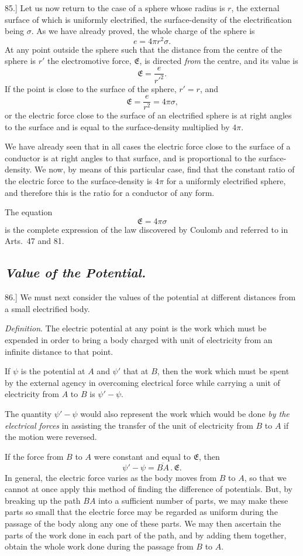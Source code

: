 \documentclass[12pt,oneside]{book}[2021/10/04]
\newcommand{\ldot}{\,.\,}
\newcommand{\Heading}{\centering\normalfont}
\newcommand{\Subsection}[1]{\subsection*{\normalsize\Heading\itshape #1}}
\newcommand{\Runhead}[1]{\fancyhead[C]{\iffloatpage{}{\small#1}}}
\newcommand{\article}[1]{\phantomsection \label{art:#1}{#1.]}}
\newcommand{\¬}{\hphantom{0}}
\begin{document}
\article{85} Let us now return to the case of a sphere whose radius
is \(r\), the external surface of which is uniformly electrified, the
surface-density of the electrification being \(\sigma\). As we have already
proved, the whole charge of the sphere is
\[
e = 4 \pi r^2 \sigma\text{.}
\]
At any point outside the sphere such that the distance from
the centre of the sphere is \(r'\) the electromotive force, \(\mathfrak{E}\), is directed
\textit{from} the centre, and its value is
\[
\mathfrak{E} = \frac{e}{r'^2}\text{.}
\]
If the point is close to the surface of the sphere, \(r' = r\), and
\[
\mathfrak{E} = \frac{e}{r^2} = 4 \pi \sigma\text{,}
\]
or the electric force close to the surface of an electrified sphere is
at right angles to the surface and is equal to the surface-density
multiplied by \(4 \pi\).

We have already seen that in all cases the electric force close
to the surface of a conductor is at right angles to that surface, and
is proportional to the surface-density. We now, by means of this
particular case, find that the constant ratio of the electric force
to the surface-density is \(4 \pi\) for a uniformly electrified sphere, and
therefore this is the ratio for a conductor of any form.

The equation
\[
\mathfrak{E} = 4 \pi \sigma
\]
is the complete expression of the law discovered by Coulomb and
referred to in Arts.\ 47 and 81.

\Subsection{Value of the Potential.}

\article{86} We must next consider the values of the potential at
different distances from a small electrified body.
\Runhead{VALUE OF THE POTENTIAL.}

\textit{Definition}. The electric potential at any point is the work which
must be expended in order to bring a body charged with unit
of electricity from an infinite distance to that point.

If \(\psi\) is the potential at \(A\) and \(\psi'\) that at \(B\), then the work
which must be spent by the external agency in overcoming
electrical force while carrying a unit of electricity from \(A\) to \(B\)
is \(\psi' - \psi\).

The quantity \(\psi' - \psi\) would also represent the work which would
be done \textit{by the electrical forces} in assisting the transfer of the unit
of electricity from \(B\) to \(A\) if the motion were reversed.

If the force from \(B\) to \(A\) were constant and equal to \(\mathfrak{E}\), then
\[
\psi' - \psi = \overline{BA} \ldot \mathfrak{E}\text{.}
\]
In general, the electric force varies as the body moves from \(B\) to \(A\),
so that we cannot at once apply this method of finding the difference
of potentials. But, by breaking up the path \(BA\) into a
sufficient number of parts, we may make these parts so small that
the electric force may be regarded as uniform during the passage
of the body along any one of these parts. We may then ascertain
the parts of the work done in each part of the path, and by adding
them together, obtain the whole work done during the passage
from \(B\) to \(A\).
\end{document}
